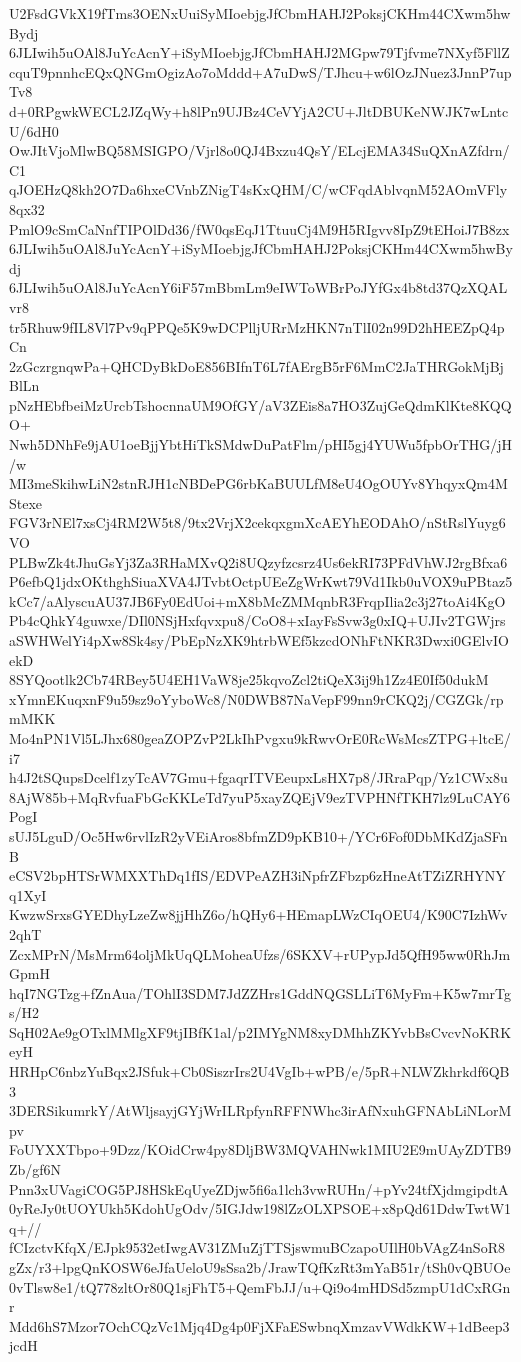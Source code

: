 U2FsdGVkX19fTms3OENxUuiSyMIoebjgJfCbmHAHJ2PoksjCKHm44CXwm5hwBydj
6JLIwih5uOAl8JuYcAcnY+iSyMIoebjgJfCbmHAHJ2MGpw79Tjfvme7NXyf5FllZ
cquT9pnnhcEQxQNGmOgizAo7oMddd+A7uDwS/TJhcu+w6lOzJNuez3JnnP7upTv8
d+0RPgwkWECL2JZqWy+h8lPn9UJBz4CeVYjA2CU+JltDBUKeNWJK7wLntcU/6dH0
OwJItVjoMlwBQ58MSIGPO/Vjrl8o0QJ4Bxzu4QsY/ELcjEMA34SuQXnAZfdrn/C1
qJOEHzQ8kh2O7Da6hxeCVnbZNigT4sKxQHM/C/wCFqdAblvqnM52AOmVFly8qx32
PmlO9cSmCaNnfTIPOlDd36/fW0qsEqJ1TtuuCj4M9H5RIgvv8IpZ9tEHoiJ7B8zx
6JLIwih5uOAl8JuYcAcnY+iSyMIoebjgJfCbmHAHJ2PoksjCKHm44CXwm5hwBydj
6JLIwih5uOAl8JuYcAcnY6iF57mBbmLm9eIWToWBrPoJYfGx4b8td37QzXQALvr8
tr5Rhuw9fIL8Vl7Pv9qPPQe5K9wDCPlljURrMzHKN7nTlI02n99D2hHEEZpQ4pCn
2zGczrgnqwPa+QHCDyBkDoE856BIfnT6L7fAErgB5rF6MmC2JaTHRGokMjBjBlLn
pNzHEbfbeiMzUrcbTshocnnaUM9OfGY/aV3ZEis8a7HO3ZujGeQdmKlKte8KQQO+
Nwh5DNhFe9jAU1oeBjjYbtHiTkSMdwDuPatFlm/pHI5gj4YUWu5fpbOrTHG/jH/w
MI3meSkihwLiN2stnRJH1cNBDePG6rbKaBUULfM8eU4OgOUYv8YhqyxQm4MStexe
FGV3rNEl7xsCj4RM2W5t8/9tx2VrjX2cekqxgmXcAEYhEODAhO/nStRslYuyg6VO
PLBwZk4tJhuGsYj3Za3RHaMXvQ2i8UQzyfzcsrz4Us6ekRI73PFdVhWJ2rgBfxa6
P6efbQ1jdxOKthghSiuaXVA4JTvbtOctpUEeZgWrKwt79Vd1Ikb0uVOX9uPBtaz5
kCc7/aAlyscuAU37JB6Fy0EdUoi+mX8bMcZMMqnbR3FrqpIlia2c3j27toAi4KgO
Pb4cQhkY4guwxe/DIl0NSjHxfqvxpu8/CoO8+xIayFsSvw3g0xIQ+UJIv2TGWjrs
aSWHWelYi4pXw8Sk4sy/PbEpNzXK9htrbWEf5kzcdONhFtNKR3Dwxi0GElvIOekD
8SYQootlk2Cb74RBey5U4EH1VaW8je25kqvoZcl2tiQeX3ij9h1Zz4E0If50dukM
xYmnEKuqxnF9u59sz9oYyboWc8/N0DWB87NaVepF99nn9rCKQ2j/CGZGk/rpmMKK
Mo4nPN1Vl5LJhx680geaZOPZvP2LkIhPvgxu9kRwvOrE0RcWsMcsZTPG+ltcE/i7
h4J2tSQupsDcelf1zyTcAV7Gmu+fgaqrITVEeupxLsHX7p8/JRraPqp/Yz1CWx8u
8AjW85b+MqRvfuaFbGcKKLeTd7yuP5xayZQEjV9ezTVPHNfTKH7lz9LuCAY6PogI
sUJ5LguD/Oc5Hw6rvlIzR2yVEiAros8bfmZD9pKB10+/YCr6Fof0DbMKdZjaSFnB
eCSV2bpHTSrWMXXThDq1fIS/EDVPeAZH3iNpfrZFbzp6zHneAtTZiZRHYNYq1XyI
KwzwSrxsGYEDhyLzeZw8jjHhZ6o/hQHy6+HEmapLWzCIqOEU4/K90C7IzhWv2qhT
ZcxMPrN/MsMrm64oljMkUqQLMoheaUfzs/6SKXV+rUPypJd5QfH95ww0RhJmGpmH
hqI7NGTzg+fZnAua/TOhlI3SDM7JdZZHrs1GddNQGSLLiT6MyFm+K5w7mrTgs/H2
SqH02Ae9gOTxlMMlgXF9tjIBfK1al/p2IMYgNM8xyDMhhZKYvbBsCvcvNoKRKeyH
HRHpC6nbzYuBqx2JSfuk+Cb0SiszrIrs2U4VgIb+wPB/e/5pR+NLWZkhrkdf6QB3
3DERSikumrkY/AtWljsayjGYjWrILRpfynRFFNWhc3irAfNxuhGFNAbLiNLorMpv
FoUYXXTbpo+9Dzz/KOidCrw4py8DljBW3MQVAHNwk1MIU2E9mUAyZDTB9Zb/gf6N
Pnn3xUVagiCOG5PJ8HSkEqUyeZDjw5fi6a1lch3vwRUHn/+pYv24tfXjdmgipdtA
0yReJy0tUOYUkh5KdohUgOdv/5IGJdw198lZzOLXPSOE+x8pQd61DdwTwtW1q+//
fCIzctvKfqX/EJpk9532etIwgAV31ZMuZjTTSjswmuBCzapoUIlH0bVAgZ4nSoR8
gZx/r3+lpgQnKOSW6eJfaUeloU9sSsa2b/JrawTQfKzRt3mYaB51r/tSh0vQBUOe
0vTlsw8e1/tQ778zltOr80Q1sjFhT5+QemFbJJ/u+Qi9o4mHDSd5zmpU1dCxRGnr
Mdd6hS7Mzor7OchCQzVc1Mjq4Dg4p0FjXFaESwbnqXmzavVWdkKW+1dBeep3jcdH
